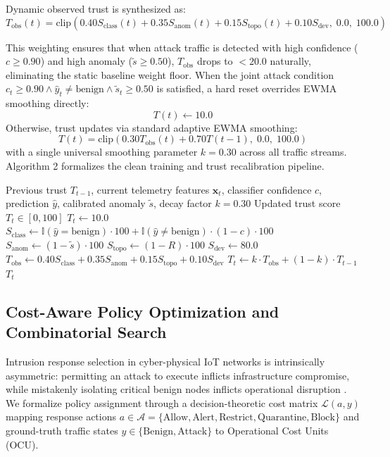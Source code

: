 \documentclass[journal,10pt,onecolumn]{IEEEtran}
\begin{document}
Dynamic observed trust is synthesized as:
$$T_{\text{obs}}(t) = \text{clip}\left(0.40 S_{\text{class}}(t) + 0.35 S_{\text{anom}}(t) + 0.15 S_{\text{topo}}(t) + 0.10 S_{\text{dev}}, \; 0.0, \; 100.0\right)$$

This weighting ensures that when attack traffic is detected with high confidence ($c \ge 0.90$) and high anomaly ($\tilde{s} \ge 0.50$), $T_{\text{obs}}$ drops to $< 20.0$ naturally, eliminating the static baseline weight floor. When the joint attack condition $c_t \ge 0.90 \land \hat{y}_t \ne \text{benign} \land \tilde{s}_t \ge 0.50$ is satisfied, a hard reset overrides EWMA smoothing directly:
$$T(t) \leftarrow 10.0$$
Otherwise, trust updates via standard adaptive EWMA smoothing:
$$T(t) = \text{clip}\left(0.30 T_{\text{obs}}(t) + 0.70 T(t-1), \; 0.0, \; 100.0\right)$$
with a single universal smoothing parameter $k = 0.30$ across all traffic streams. Algorithm 2 formalizes the clean training and trust recalibration pipeline.

\begin{algorithm}[t]
\caption{Adaptive Dynamic Trust Updating with Joint Hard-Reset}
\label{alg:trust_update}
\begin{algorithmic}[1]
\Require Previous trust $T_{t-1}$, current telemetry features $\mathbf{x}_t$, classifier confidence $c$, prediction $\hat{y}$, calibrated anomaly $\tilde{s}$, decay factor $k=0.30$
\Ensure Updated trust score $T_t \in [0, 100]$
    \State $T_t \leftarrow 10.0$ 
\Else
    \State $S_{\text{class}} \leftarrow \mathbb{I}(\hat{y} = \text{benign}) \cdot 100 + \mathbb{I}(\hat{y} \ne \text{benign}) \cdot (1 - c) \cdot 100$
    \State $S_{\text{anom}} \leftarrow (1 - \tilde{s}) \cdot 100$
    \State $S_{\text{topo}} \leftarrow (1 - R) \cdot 100$
    \State $S_{\text{dev}} \leftarrow 80.0$ 
    \State $T_{\text{obs}} \leftarrow 0.40 S_{\text{class}} + 0.35 S_{\text{anom}} + 0.15 S_{\text{topo}} + 0.10 S_{\text{dev}}$
    \State $T_t \leftarrow k \cdot T_{\text{obs}} + (1 - k) \cdot T_{t-1}$ 
\EndIf
\State \Return $T_t$
\end{algorithmic}
\end{algorithm}


\subsection{Cost-Aware Policy Optimization and Combinatorial Search}
Intrusion response selection in cyber-physical IoT networks is intrinsically asymmetric: permitting an attack to execute inflicts infrastructure compromise, while mistakenly isolating critical benign nodes inflicts operational disruption \cite{25, 26}. We formalize policy assignment through a decision-theoretic cost matrix $\mathcal{L}(a, y)$ mapping response actions $a \in \mathcal{A} = \{\text{Allow}, \text{Alert}, \text{Restrict}, \text{Quarantine}, \text{Block}\}$ and ground-truth traffic states $y \in \{\text{Benign}, \text{Attack}\}$ to Operational Cost Units (OCU).
\end{document}
